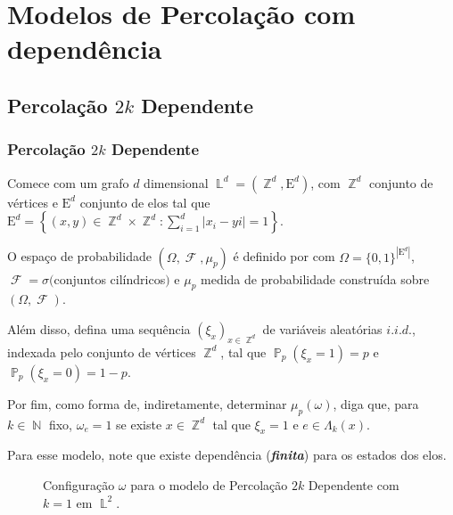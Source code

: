 \documentclass[9pt]{beamer}
\theoremstyle{definition} %
\DeclareMathOperator{\PX}{\mathbb{P}} %
\DeclareMathOperator{\FX}{\mathcal{F}} %
\DeclareMathOperator{\NX}{\mathbb{N}} %
\DeclareMathOperator{\ZX}{\mathbb{Z}} %
\DeclareMathOperator{\LX}{\mathbb{L}} %
\begin{document}
	\section{Modelos de Percolação com dependência}
	\subsection{Percolação $2k$ Dependente}
	\begin{frame}[t]
	\frametitle{Percolação $2k$ Dependente}
	Comece com um grafo $d$ dimensional $\LX^d = (\ZX^d, \text{E}^d)$, com $\ZX^d$ conjunto de vértices e $\text{E}^d$ conjunto de elos tal que $\text{E}^d = \left\{(x, y) \in \ZX^d \times \ZX^d : \sum_{i = 1}^{d} |x_i - yi| = 1\right\}$.\pause
	
	O espaço de probabilidade $(\Omega, \FX, \mu_p)$ é definido por com $\Omega = \{0, 1\}^{|\text{E}^d|}$, $\FX = \sigma($conjuntos cilíndricos$)$ e $\mu_p$ medida de probabilidade construída sobre $(\Omega, \FX)$.\pause
	
	\begin{minipage}[t]{0.50 \textwidth}
		\vspace{-2pt}
		Além disso, defina uma sequência $(\xi_x)_{x \in \ZX^d}$ de variáveis aleatórias $i.i.d.$, indexada pelo conjunto de vértices $\ZX^d$, tal que $\PX_p(\xi_x = 1) = p$ e $\PX_p(\xi_x = 0) = 1 - p$.\pause
		
		\vspace{9pt}
		Por fim, como forma de, indiretamente, determinar $\mu_p(\omega)$, diga que, para $k \in \NX$ fixo, $\omega_e = 1$ se existe $x \in \ZX^d$ tal que $\xi_x = 1$ e $e \in \Lambda_k(x)$.
		
		\vspace{8pt}
		Para esse modelo, note que existe dependência (\textit{\textbf{finita}}) para os estados dos elos.
	\end{minipage}
	\begin{minipage}[t]{0.50 \textwidth}
		\begin{figure}
			\vspace{-2pt}
			
			\vspace{-3pt}
			\caption{\justifying Configuração $\omega$ para o modelo de Percolação $2k$ Dependente com $k = 1$ em $\LX^2$.}
			\label{fig:caixa-2n}
		\end{figure}
	\end{minipage}
	\end{frame}
\end{document}
